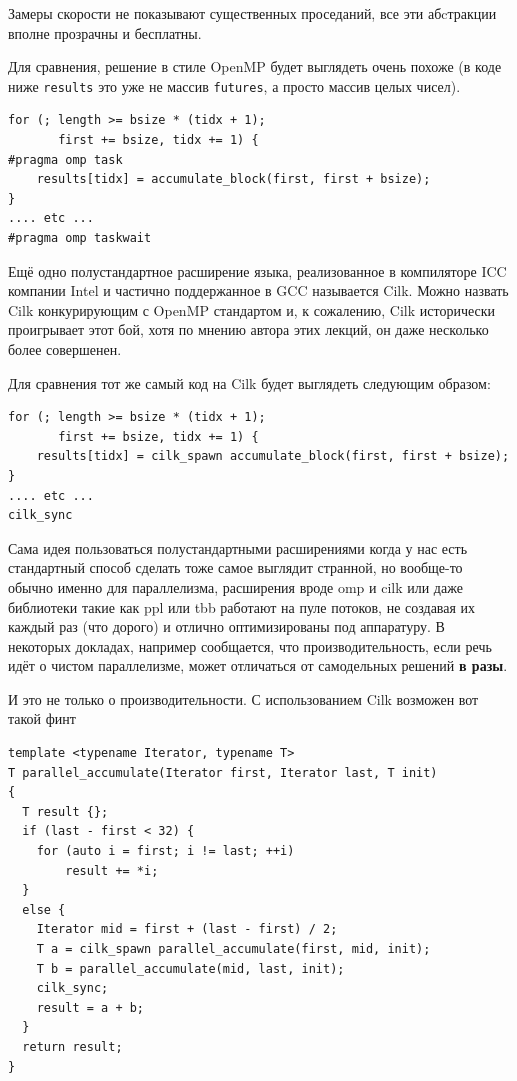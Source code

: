 \documentclass[a4paper,12pt,oneside]{book}
\newif\ifmulti
\begin{document}
Замеры скорости не показывают существенных проседаний, все эти абcтракции вполне прозрачны и бесплатны.

\ifmulti
TODO: \lstinline!std::launch::async!, \lstinline!std::launch::deffered!
\fi

Для сравнения, решение в стиле OpenMP будет выглядеть очень похоже (в коде ниже \lstinline!results! это уже не массив \lstinline!futures!, а просто массив целых чисел).

\begin{lstlisting}
for (; length >= bsize * (tidx + 1); 
       first += bsize, tidx += 1) {
#pragma omp task
    results[tidx] = accumulate_block(first, first + bsize);
}
.... etc ...
#pragma omp taskwait
\end{lstlisting}

Ещё одно полустандартное расширение языка, реализованное в компиляторе ICC компании Intel и частично поддержанное в GCC называется Cilk. Можно назвать Cilk конкурирующим с OpenMP стандартом и, к сожалению, Cilk исторически проигрывает этот бой, хотя по мнению автора этих лекций, он даже несколько более совершенен.

Для сравнения тот же самый код на Cilk будет выглядеть следующим образом:

\begin{lstlisting}
for (; length >= bsize * (tidx + 1); 
       first += bsize, tidx += 1) {
    results[tidx] = cilk_spawn accumulate_block(first, first + bsize);
}
.... etc ...
cilk_sync
\end{lstlisting}

Сама идея пользоваться полустандартными расширениями когда у нас есть стандартный способ сделать тоже самое выглядит странной, но вообще-то обычно именно для параллелизма, расширения вроде omp и cilk или даже библиотеки такие как ppl или tbb работают на пуле потоков, не создавая их каждый раз (что дорого) и отлично оптимизированы под аппаратуру. В некоторых докладах, например \cite{talk:halpern:parallelism} сообщается, что производительность, если речь идёт о чистом параллелизме, может отличаться от самодельных решений \textbf{в разы}.

И это не только о производительности. С использованием Cilk возможен вот такой финт

\begin{lstlisting}
template <typename Iterator, typename T>
T parallel_accumulate(Iterator first, Iterator last, T init)
{
  T result {};
  if (last - first < 32) {
    for (auto i = first; i != last; ++i)
	    result += *i;
  }
  else {
    Iterator mid = first + (last - first) / 2;
    T a = cilk_spawn parallel_accumulate(first, mid, init);
    T b = parallel_accumulate(mid, last, init);
    cilk_sync;
    result = a + b;
  }
  return result;
}
\end{lstlisting}
\end{document}
